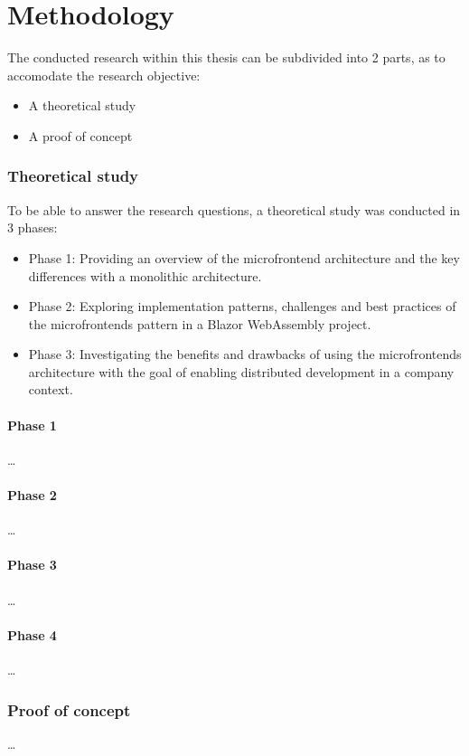 
\chapter{Methodology}
\label{ch:methodology}


The conducted research within this thesis can be subdivided into 2 parts, as to
accomodate the research objective:

\begin{itemize}
  \item A theoretical study
  \item A proof of concept
\end{itemize}

\subsection{Theoretical study}
To be able to answer the research questions, a theoretical study was conducted
in 3 phases:
\begin{itemize}
    \item Phase 1: Providing an overview of the microfrontend architecture and
    the key differences with a monolithic architecture.
    \item Phase 2: Exploring implementation patterns, challenges and best
    practices of the microfrontends pattern in a Blazor WebAssembly project.
    \item Phase 3: Investigating the benefits and drawbacks of using the
    microfrontends architecture with the goal of enabling distributed
    development in a company context.
\end{itemize}

\subsubsection{Phase 1}
\dots %

\subsubsection{Phase 2}
\dots %

\subsubsection{Phase 3}
\dots %

\subsubsection{Phase 4}
\dots %


\subsection{Proof of concept}
\dots %